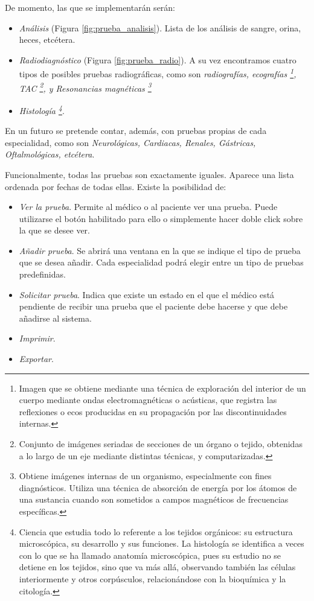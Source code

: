 \documentclass[a4paper,oneside,11pt]{book}
\begin{document}
			De momento, las que se implementarán serán:
	
			\begin{itemize}
				\item \textit{Análisis} (Figura \ref{fig:prueba_analisis}). Lista de los análisis de sangre, orina, heces, etcétera.
				\item \textit{Radiodiagnóstico} (Figura \ref{fig:prueba_radio}). A su vez encontramos cuatro tipos de posibles pruebas radiográficas, como son \textit{radiografías, ecografías \footnote{Imagen que se obtiene mediante una técnica de exploración del interior de un cuerpo mediante ondas electromagnéticas o acústicas, que registra las reflexiones o ecos producidas en su propagación por las discontinuidades internas.}, TAC \footnote{Conjunto de imágenes seriadas de secciones de un órgano o tejido, obtenidas a lo largo de un eje mediante distintas técnicas, y computarizadas.}, y Resonancias magnéticas \footnote{Obtiene imágenes internas de un organismo, especialmente con fines diagnósticos. Utiliza una técnica de absorción de energía por los átomos de una sustancia cuando son sometidos a campos magnéticos de frecuencias específicas.}}
				\item \textit{Histología \footnote{Ciencia que estudia todo lo referente a los tejidos orgánicos: su estructura microscópica, su desarrollo y sus funciones. La histología se identifica a veces con lo que se ha llamado anatomía microscópica, pues su estudio no se detiene en los tejidos, sino que va más allá, observando también las células interiormente y otros corpúsculos, relacionándose con la bioquímica y la citología.}}.
			\end{itemize}
			
			En un futuro se pretende contar, además, con pruebas propias de cada especialidad, como son \textit{Neurológicas, Cardiacas, Renales, Gástricas, Oftalmológicas, etcétera}.
			
			Funcionalmente, todas las pruebas son exactamente iguales. Aparece una lista ordenada por fechas de todas ellas. Existe la posibilidad de:
			
			\begin{itemize}
				\item \textit{Ver la prueba}. Permite al médico o al paciente ver una prueba. Puede utilizarse el botón habilitado para ello o simplemente hacer doble click sobre la que se desee ver.
				\item \textit{Añadir prueba}. Se abrirá una ventana en la que se indique el tipo de prueba que se desea añadir. Cada especialidad podrá elegir entre un tipo de pruebas predefinidas.
				\item \textit{Solicitar prueba}. Indica que existe un estado en el que el médico está pendiente de recibir una prueba que el paciente debe hacerse y que debe añadirse al sistema.
				\item \textit{Imprimir}. 
				\item \textit{Exportar}. 
			\end{itemize}
			
\end{document}
